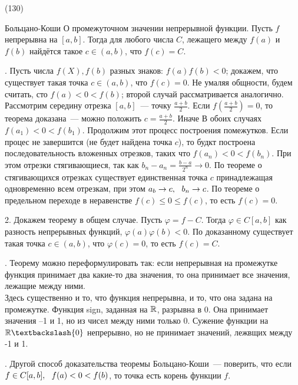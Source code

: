 (130)

\T \q Больцано-Коши О промежуточном значении непрерывной функции. Пусть $f$ непрерывна на $[a, b]$. Тогда для любого числа $C$, лежащего между $f(a)$ и $f(b)$ найдётся такое $c \in (a, b)$, что $f(c) = C$.

. Пусть числа $f(X), f(b)$ разных знаков: $f(a)f(b) < 0$; докажем, что существует такая точка $c \in (a, b)$, что $f(c) = 0$. Не умаляя общности, будем считать, сто $f(a) < 0 < f(b)$; второй случай рассматривается аналогично. Рассмотрим середину отрезка $[a, b]$~--- точку $\frac{a + b}2$. Если $f(\frac{a + b}2) = 0$, то теорема доказана~--- можно положить $c = \frac{a +b}2$. Иначе
\F{$[a_1, b_1 = \begin{cases}[\frac{a + b}2, b], & f(\frac{a + b}2) < 0,\\ [a, \frac{a + b}2], & f(\frac{a + b}2) < 0. \end{cases}$} В обоих случаях $f(a_1) < 0 < f(b_1)$. Продолжим этот процесс построения помежутков. Если процес не завершится (не будет найдена точка $c$), то будкт построена последовательность вложенных отрезков, таких что $f(a_n) < 0 < f(b_n)$. При этом отрезки стягивающиеся, так как $b_n - a_n = \frac{b - a}{2^n} \to 0$. По теореме о стягивающихся отрезках существует единственная точка $c$ принадлежащая одновременно всем отрезкам, при этом $a_b \to c,\ \  b_n \to c$. По теореме о предельном переходе в неравенстве $f(c) \le 0 \le f(c)$, то есть $f(c) = 0$.

2. Докажем теорему в общем случае. Пусть $\varphi = f - C$. Тогда $\varphi \in C[a, b]$ как разность непрерывных функций, $\varphi(a)\varphi(b) < 0$. По доказанному существует такая точка $c \in (a, b)$, что $\varphi(c) = 0$, то есть $f(c) = C$.

. Теорему можно переформулировать так: если непрерывная на промежутке функция принимает два какие-то два значения, то она принимает все значения, лежащие между ними.\\
Здесь существенно и то, что функция непрерывна, и то, что она задана на промежутке. Функция sign, заданная на $\mathbb{R}$, разрывна в 0. Она принимает значения --1 и 1, но из чисел между ними только 0. Сужение функции на $\R\bsl\{0\}$ непрерывно, но не принимает значений, лежвщих между -1 и 1.

. Другой способ доказательства теоремы Больцано-Коши~--- поверить, что если $f \in C[a, b],\ \  f(a) < 0 < f(b)$, то точка  есть корень функции $f$.